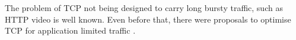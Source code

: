 \documentclass[10pt,sigconf]{acmart}
\begin{document}







The problem of TCP not being designed to carry long bursty traffic, such as HTTP video is well known. Even before that, there were proposals to optimise TCP for application limited traffic \cite{rfc2861-2000-padhye-congestion-window-validation}.
\end{document}
